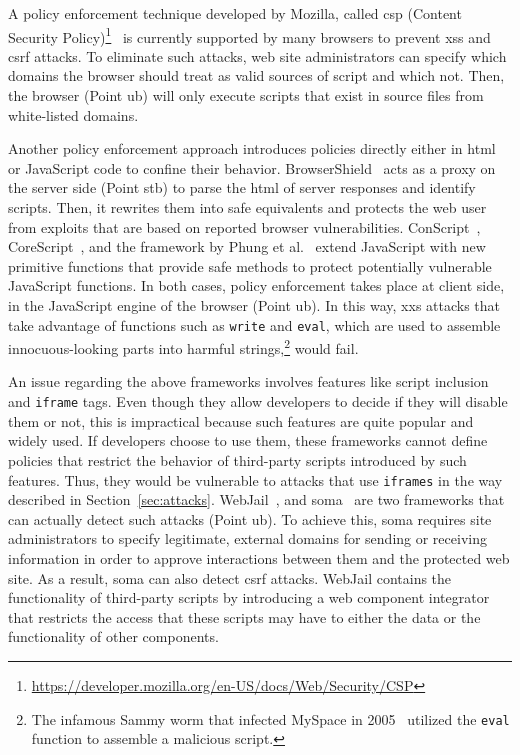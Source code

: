 \documentclass[10pt,journal,compsoc]{IEEEtran}
\begin{document}
A policy enforcement technique developed by Mozilla,
called {\sc csp} (Content Security
Policy)\footnote{\scriptsize\url{https://developer.mozilla.org/en-US/docs/Web/Security/CSP}}~\cite{SSM10}
is currently supported by many browsers to prevent
{\sc xss} and {\sc csrf} attacks. To eliminate such
attacks, web site administrators
can specify which domains the browser should treat
as valid sources of script and which not. Then, the browser
(Point {\sc ub}) will only execute scripts that exist in
source files from white-listed domains.

Another policy enforcement approach introduces
policies directly either in {\sc html} or JavaScript code
to confine their behavior. BrowserShield~\cite{RDWDE07}
acts as a proxy on the server side (Point {\sc s}t{\sc b}) to
parse the {\sc html} of server responses and identify
scripts. Then, it rewrites them into safe equivalents
and protects the web user from exploits
that are based on reported browser vulnerabilities.
ConScript~\cite{ML10}, CoreScript~\cite{YCIS07},
and the framework by Phung et al.~\cite{PSC09}
extend JavaScript with new primitive functions that
provide safe methods to protect potentially vulnerable
JavaScript functions. In both cases, policy enforcement takes
place at client side, in the JavaScript engine of the browser (Point {\sc ub}).
In this way, {\sc xxs} attacks that take advantage
of functions such as {\tt write} and {\tt eval}, which are
used to assemble innocuous-looking parts into harmful
strings,\footnote{\scriptsize The infamous Sammy worm that
infected MySpace in 2005~\cite{SP07,ELX07}
utilized the {\tt eval} function to assemble a
malicious script.} would fail.

An issue regarding the above frameworks
involves features like script inclusion
and {\tt iframe} tags. Even though they allow developers
to decide if they will disable them or not,
this is impractical because such features are quite popular and widely used.
If developers choose to use them, these frameworks cannot
define policies that restrict the behavior of third-party
scripts introduced by such features. Thus, they would
be vulnerable to attacks that use {\tt iframes}
in the way described in Section~\ref{sec:attacks}.
WebJail~\cite{VDDPJ11}, and {\sc soma}~\cite{OWVS08}
are two frameworks that can actually detect such attacks (Point {\sc
  ub}). To achieve this, {\sc soma} requires site administrators to
specify legitimate, external domains for sending or receiving
information in order to approve interactions between them and the
protected web site. As a result, {\sc soma} can also detect {\sc csrf}
attacks. WebJail contains the functionality of third-party scripts by
introducing a web component integrator that restricts the access that
these scripts may have to either the data or the functionality of
other components.
\end{document}

